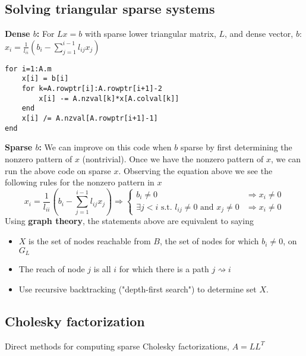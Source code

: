 \documentclass{article}
\begin{document}
\subsection{Solving triangular sparse systems}
\textbf{Dense $b$:} For $Lx=b$ with sparse lower triangular matrix, $L$, and dense vector, $b$: $x_i = \frac{1}{l_{ii}}\left(b_i - \sum_{j=1}^{i-1}l_{ij}x_j\right)$
\begin{lstlisting}
for i=1:A.m
    x[i] = b[i]
    for k=A.rowptr[i]:A.rowptr[i+1]-2
        x[i] -= A.nzval[k]*x[A.colval[k]]
    end
    x[i] /= A.nzval[A.rowptr[i+1]-1]
end
\end{lstlisting}
\textbf{Sparse $b$:} We can improve on this code when $b$ sparse by first determining the nonzero pattern of $x$ (nontrivial). Once we have the nonzero pattern of $x$, we can run the above code on sparse $x$. Observing the equation above we see the following rules for the nonzero pattern in $x$
\begin{equation*}
    x_i = \frac{1}{l_{ii}}\left(b_i - \sum_{j=1}^{i-1}l_{ij}x_j\right) \Longrightarrow 
    \begin{cases}
        b_i \neq 0 & \Rightarrow x_i \neq 0\\
        \exists j<i \textrm{ s.t. } l_{ij} \neq 0 \textrm{ and } x_j \neq 0 & \Rightarrow x_i \neq 0
    \end{cases}
\end{equation*}
Using \textbf{graph theory}, the statements above are equivalent to saying
\begin{itemize}
    \item $X$ is the set of nodes reachable from $B$, the set of nodes for which $b_i \neq 0$, on $G_L$
    \item The reach of node $j$ is  all $i$ for which there is a path $j \rightsquigarrow i$
    \item Use recursive backtracking ("depth-first search") to determine set $X$.
\end{itemize}

\subsection{Cholesky factorization}
Direct methods for computing sparse Cholesky factorizations, $A=LL^T$
\end{document}
